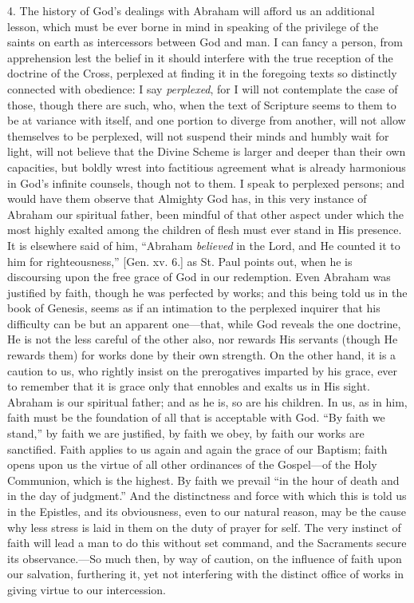4. The history of God's dealings with Abraham will afford us an
additional lesson, which must be ever borne in mind in speaking of the
privilege of the saints on earth as intercessors between God and man.
I can fancy a person, from apprehension lest the belief in it should
interfere with the true reception of the doctrine of the Cross,
perplexed at finding it in the foregoing texts so distinctly connected
with obedience: I say \emph{perplexed}, for I will not contemplate the
case of those, though there are such, who, when the text of Scripture
seems to them to be at variance with itself, and one portion to
diverge from another, will not allow themselves to be perplexed, will
not suspend their minds and humbly wait for light, will not believe
that the Divine Scheme is larger and deeper than their own capacities,
but boldly wrest into factitious agreement what is already harmonious
in God's infinite counsels, though not to them. I speak to perplexed
persons; and would have them observe that Almighty God has, in this
very instance of Abraham our spiritual father, been mindful of that
other aspect under which the most highly exalted among the children of
flesh must ever stand in His presence. It is elsewhere said of him,
``Abraham \emph{believed} in the Lord, and He counted it to him
for righteousness,'' [Gen. xv. 6.] as St. Paul points out, when he
is discoursing upon the free grace of God in our redemption. Even
Abraham was justified by faith, though he was perfected by works; and
this being told us in the book of Genesis, seems as if an intimation
to the perplexed inquirer that his difficulty can be but an apparent
one—that, while God reveals the one doctrine, He is not the less
careful of the other also, nor rewards His servants (though He rewards
them) for works done by their own strength. On the other hand, it is a
caution to us, who rightly insist on the prerogatives imparted by his
grace, ever to remember that it is grace only that ennobles and exalts
us in His sight. Abraham is our spiritual father; and as he is, so are
his children. In us, as in him, faith must be the foundation of all
that is acceptable with God. ``By faith we stand,'' by faith
we are justified, by faith we obey, by faith our works are sanctified.
Faith applies to us again and again the grace of our Baptism; faith
opens upon us the virtue of all other ordinances of the Gospel—of
the Holy Communion, which is the highest. By faith we prevail ``in
the hour of death and in the day of judgment.'' And the
distinctness and force with which this is told us in the Epistles, and
its obviousness, even to our natural reason, may be the cause why less
stress is laid in them on the duty of prayer for self. The very
instinct of faith will lead a man to do this without set command, and
the Sacraments secure its observance.—So much then, by way of
caution, on the influence of faith upon our salvation, furthering it,
yet not interfering with the distinct office of works in giving virtue
to our intercession.

